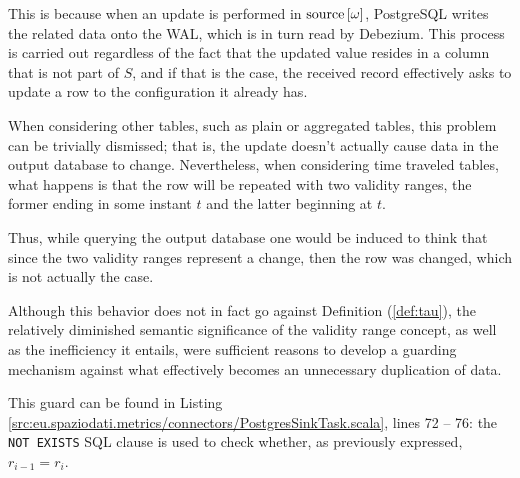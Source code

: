 This is because when an update is performed in $\text{source}\left[{\omega}\right]$, PostgreSQL writes the related data onto the WAL, which is in turn read by Debezium.
This process is carried out regardless of the fact that the updated value resides in a column that is not part of $S$, and if that is the case, the received record effectively asks to update a row to the configuration it already has.

When considering other tables, such as plain or aggregated tables, this problem can be trivially dismissed; that is, the update doesn't actually cause data in the output database to change.
Nevertheless, when considering time traveled tables, what happens is that the row will be repeated with two validity ranges, the former ending in some instant $t$ and the latter beginning at $t$.

Thus, while querying the output database one would be induced to think that since the two validity ranges represent a change, then the row was changed, which is not actually the case.

Although this behavior does not in fact go against Definition (\ref{def:tau}), the relatively diminished semantic significance of the validity range concept, as well as the inefficiency it entails, were sufficient reasons to develop a guarding mechanism against what effectively becomes an unnecessary duplication of data.

This guard can be found in Listing \ref{src:eu.spaziodati.metrics/connectors/PostgresSinkTask.scala}, lines 72 -- 76: the \texttt{NOT EXISTS} SQL clause is used to check whether, as previously expressed, $r_{i-1} = r_i$.
